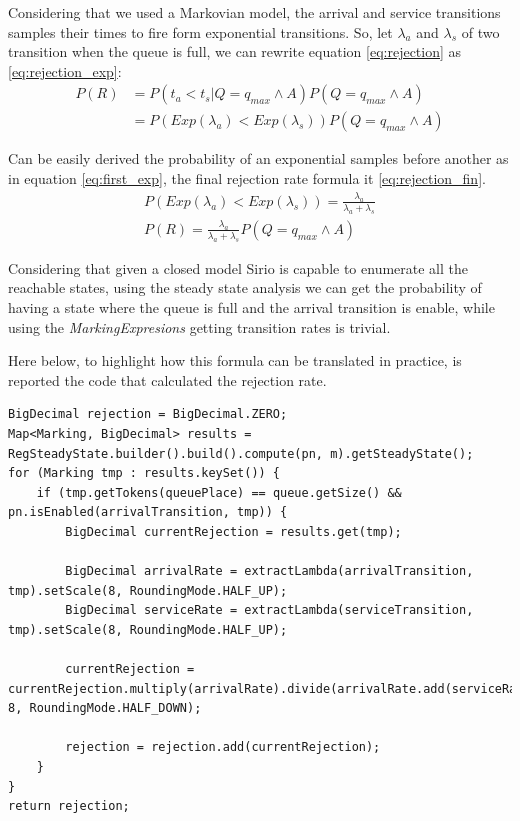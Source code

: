 Considering that we used a Markovian model, the arrival and service transitions samples their times to fire form exponential transitions. So, let $\lambda_a$ and $\lambda_s$ of two transition when the queue is full, we can rewrite equation \ref{eq:rejection} as \ref{eq:rejection_exp}:
\begin{equation}
    \label{eq:rejection_exp}
    \begin{split}
    P(R) & =  P(t_a<t_s|Q=q_{max}\land A)P(Q=q_{max}\land A) \\
     & = P(Exp(\lambda_a)<Exp(\lambda_s))P(Q=q_{max}\land A)
    \end{split}
\end{equation}

Can be easily derived the probability of an exponential samples before another as in equation \ref{eq:first_exp}, the final rejection rate formula it \ref{eq:rejection_fin}.
\begin{gather}
P(Exp(\lambda_a)<Exp(\lambda_s)) = \frac{\lambda_a}{\lambda_a + \lambda_s} \label{eq:first_exp}\\
P(R)=\frac{\lambda_a}{\lambda_a + \lambda_s}P(Q=q_{max}\land A) \label{eq:rejection_fin}
\end{gather}

Considering that given a closed model Sirio is capable to enumerate all the reachable states, using the steady state analysis we can get the probability of having a state where the queue is full and the arrival transition is enable, while using the \textit{MarkingExpresions} getting transition rates is trivial.

Here below, to highlight how this formula can be translated in practice, is reported the code that calculated the rejection rate.
\begin{lstlisting}
BigDecimal rejection = BigDecimal.ZERO;
Map<Marking, BigDecimal> results = RegSteadyState.builder().build().compute(pn, m).getSteadyState();
for (Marking tmp : results.keySet()) {
    if (tmp.getTokens(queuePlace) == queue.getSize() && pn.isEnabled(arrivalTransition, tmp)) {
        BigDecimal currentRejection = results.get(tmp);

        BigDecimal arrivalRate = extractLambda(arrivalTransition, tmp).setScale(8, RoundingMode.HALF_UP);
        BigDecimal serviceRate = extractLambda(serviceTransition, tmp).setScale(8, RoundingMode.HALF_UP);

        currentRejection = currentRejection.multiply(arrivalRate).divide(arrivalRate.add(serviceRate), 8, RoundingMode.HALF_DOWN);

        rejection = rejection.add(currentRejection);
    }
}
return rejection;
\end{lstlisting}

